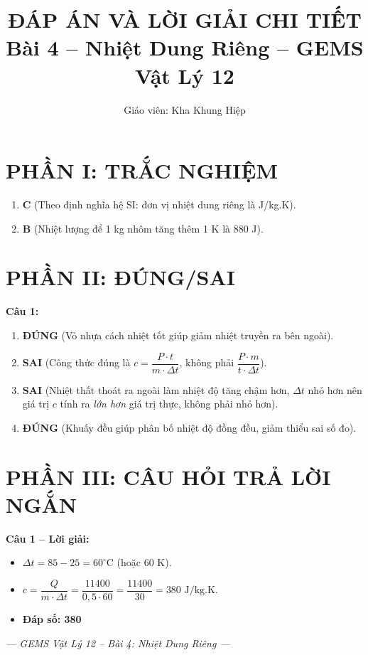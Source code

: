 \documentclass[12pt,a4paper]{article}
\title{\textbf{ĐÁP ÁN VÀ LỜI GIẢI CHI TIẾT}\\
\large Bài 4 -- Nhiệt Dung Riêng -- GEMS Vật Lý 12}
\author{Giáo viên: Kha Khung Hiệp}
\date{}
\begin{document}
\maketitle

\section*{PHẦN I: TRẮC NGHIỆM}
\begin{enumerate}
  \item \textbf{C} (Theo định nghĩa hệ SI: đơn vị nhiệt dung riêng là J/kg.K).
  \item \textbf{B} (Nhiệt lượng để 1 kg nhôm tăng thêm 1 K là 880 J).
\end{enumerate}

\section*{PHẦN II: ĐÚNG/SAI}
\textbf{Câu 1:}
\begin{enumerate}[label=\alph*)]
  \item \textbf{ĐÚNG} (Vỏ nhựa cách nhiệt tốt giúp giảm nhiệt truyền ra bên ngoài).
  \item \textbf{SAI} (Công thức đúng là $c = \dfrac{P \cdot t}{m \cdot \Delta t}$, không phải $\dfrac{P \cdot m}{t \cdot \Delta t}$).
  \item \textbf{SAI} (Nhiệt thất thoát ra ngoài làm nhiệt độ tăng chậm hơn, $\Delta t$ nhỏ hơn nên giá trị $c$ tính ra \textit{lớn hơn} giá trị thực, không phải nhỏ hơn).
  \item \textbf{ĐÚNG} (Khuấy đều giúp phân bố nhiệt độ đồng đều, giảm thiểu sai số đo).
\end{enumerate}

\section*{PHẦN III: CÂU HỎI TRẢ LỜI NGẮN}
\textbf{Câu 1 -- Lời giải:}
\begin{itemize}
  \item $\Delta t = 85 - 25 = 60^{\circ}\text{C}$ (hoặc 60 K).
  \item $c = \dfrac{Q}{m \cdot \Delta t} = \dfrac{11400}{0{,}5 \cdot 60} = \dfrac{11400}{30} = 380\text{ J/kg.K}$.
  \item \textbf{Đáp số: 380}
\end{itemize}

\vfill
\begin{center}
\textit{--- GEMS Vật Lý 12 -- Bài 4: Nhiệt Dung Riêng ---}
\end{center}
\end{document}
